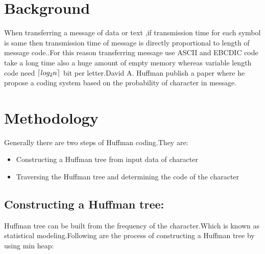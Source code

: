 \documentclass[conference]{IEEEtran}
\DeclarePairedDelimiter\ceil{\lceil}{\rceil}
\begin{document}
\section{Background}
When transferring a message of data or text ,if transmission time for each symbol is same then  transmission time of message is directly proportional to length of message code.\textsc{\cite{huffman1952method}}.For this reason transferring message use ASCII and EBCDIC  code take a long time also a huge amount of empty memory whereas variable length code need $\ceil*{log_2n}$ bit per letter\textsc{\cite{vitter1987design}}.David A. Huffman publish a paper where he propose a coding system based on the probability of character in message. 




\section{Methodology}
\label{sec:meth}
Generally there are two steps of Huffman coding.They are:
\begin{itemize}
  \item Constructing a Huffman tree from input data of character
  \item Traversing the Huffman tree and determining the code of the character
\end{itemize}
\subsection{\textbf{Constructing a Huffman tree:}}

Huffman tree can be built from the frequency of the character.Which is known as statistical modeling\textsc{\cite{nelson1995data}}.Following are the process\textsc{\cite{sharma2010compression}} of constructing a Huffman tree by using min heap:
\renewcommand{\labelenumi}{\roman{enumi}}
\end{document}
